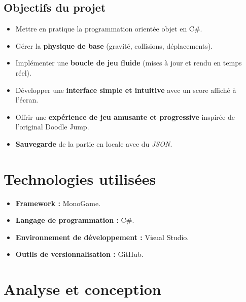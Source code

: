 \documentclass[french]{article}
\begin{document}
\subsection{Objectifs du projet}
\begin{itemize}
	\item Mettre en pratique la programmation orientée objet en C\#.
	\item Gérer la \textbf{physique de base} (gravité, collisions, déplacements).
	\item Implémenter une \textbf{boucle de jeu fluide} (mises à jour et rendu en temps réel).
	\item Développer une \textbf{interface simple et intuitive} avec un score affiché à l’écran.
	\item Offrir une \textbf{expérience de jeu amusante et progressive} inspirée de l’original Doodle Jump.
	\item \textbf{Sauvegarde} de la partie en locale avec du \textit{JSON}.
\end{itemize}

\section{Technologies utilisées}
\begin{itemize}
	\item \textbf{Framework :} MonoGame.
	\item \textbf{Langage de programmation :} C\#.
	\item \textbf{Environnement de développement :} Visual Studio.
	\item \textbf{Outils de versionnalisation :} GitHub.
\end{itemize}

\section{Analyse et conception}
\end{document}
